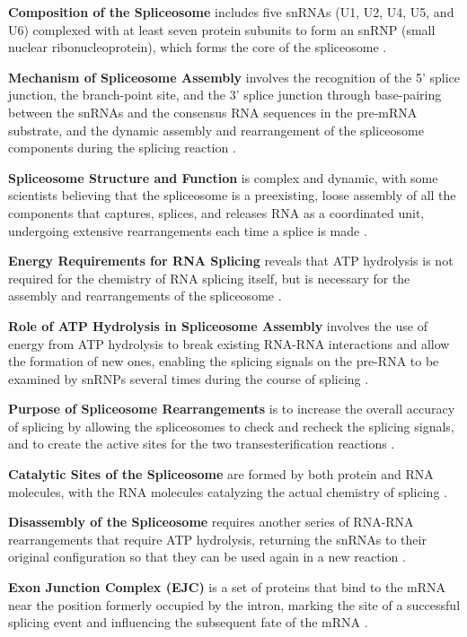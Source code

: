 \textbf{Composition of the Spliceosome} includes five snRNAs (U1, U2, U4, U5, and U6) complexed with at least seven protein subunits to form an snRNP (small nuclear ribonucleoprotein), which forms the core of the spliceosome \cite*{L1-Chapter6}.

\textbf{Mechanism of Spliceosome Assembly} involves the recognition of the 5' splice junction, the branch-point site, and the 3' splice junction through base-pairing between the snRNAs and the consensus RNA sequences in the pre-mRNA substrate, and the dynamic assembly and rearrangement of the spliceosome components during the splicing reaction \cite*{L1-Chapter6}.

\textbf{Spliceosome Structure and Function} is complex and dynamic, with some scientists believing that the spliceosome is a preexisting, loose assembly of all the components that captures, splices, and releases RNA as a coordinated unit, undergoing extensive rearrangements each time a splice is made \cite*{L1-Chapter6}.

\textbf{Energy Requirements for RNA Splicing} reveals that ATP hydrolysis is not required for the chemistry of RNA splicing itself, but is necessary for the assembly and rearrangements of the spliceosome \cite*{L1-Chapter6}.

\textbf{Role of ATP Hydrolysis in Spliceosome Assembly} involves the use of energy from ATP hydrolysis to break existing RNA-RNA interactions and allow the formation of new ones, enabling the splicing signals on the pre-RNA to be examined by snRNPs several times during the course of splicing \cite*{L1-Chapter6}.

\textbf{Purpose of Spliceosome Rearrangements} is to increase the overall accuracy of splicing by allowing the spliceosomes to check and recheck the splicing signals, and to create the active sites for the two transesterification reactions \cite*{L1-Chapter6}.

\textbf{Catalytic Sites of the Spliceosome} are formed by both protein and RNA molecules, with the RNA molecules catalyzing the actual chemistry of splicing \cite*{L1-Chapter6}.

\textbf{Disassembly of the Spliceosome} requires another series of RNA-RNA rearrangements that require ATP hydrolysis, returning the snRNAs to their original configuration so that they can be used again in a new reaction \cite*{L1-Chapter6}.

\textbf{Exon Junction Complex (EJC)} is a set of proteins that bind to the mRNA near the position formerly occupied by the intron, marking the site of a successful splicing event and influencing the subsequent fate of the mRNA \cite*{L1-Chapter6}.

